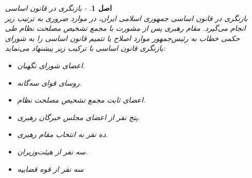 \documentclass[12pt]{article}
\newtheorem{asl}{اصل}
\begin{document}
\begin{asl}- 
بازنگری در قانون اساسی
\\
بازنگری در قانون اساسی جمهوری اسلامی ایران، در موارد ضروری به ترتیب زیر انجام می‌گیرد. مقام رهبری پس از مشورت با مجمع تشخیص مصلحت نظام طی حکمی خطاب به رئیس‌جمهور موارد اصلاح یا تتمیم قانون اساسی را به شورای بازنگری قانون اساسی با ترکیب زیر پیشنهاد می‌نماید: 
\renewcommand{\labelitemi}{$-$}
\begin{itemize}
	\item 
اعضای شورای نگهبان. 
	\item 
روسای قوای سه‌گانه. 
	\item 
اعضای ثابت مجمع تشخیص مصلحت نظام. 
	\item 
پنج نفر از اعضای مجلس خبرگان رهبری. 
	\item 
ده نفر به انتخاب مقام رهبری. 
	\item 
سه نفر از هیئت‌وزیران. 
	\item 
سه نفر از قوه قضاییه
\end{itemize}
\end{asl}


	
	
	
	
\end{document}
